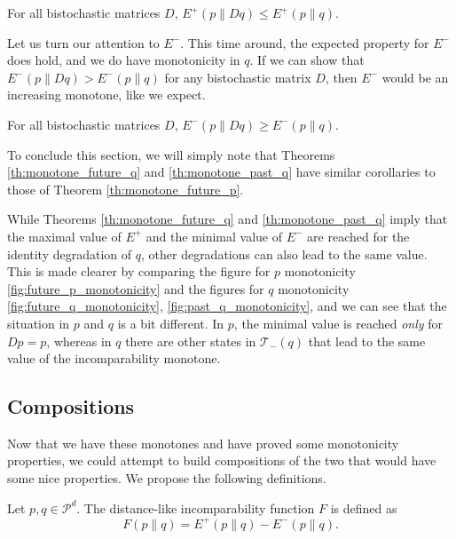 \begin{theorem} \label{th:monotone_future_q}
    For all bistochastic matrices $D$, $E^+ (p \parallel Dq) \leq E^+ (p \parallel q)$.
\end{theorem}

Let us turn our attention to $E^-$. This time around, the expected property for $E^-$ does hold, and we do have monotonicity in $q$. If we can show that $E^-(p \parallel Dq) > E^-(p \parallel q)$ for any bistochastic matrix $D$, then $E^-$ would be an increasing monotone, like we expect.

\begin{theorem} \label{th:monotone_past_q}
    For all bistochastic matrices $D$, $E^- (p \parallel Dq) \geq E^- (p \parallel q)$.
\end{theorem}

To conclude this section, we will simply note that Theorems \ref{th:monotone_future_q} and \ref{th:monotone_past_q} have similar corollaries to those of Theorem \ref{th:monotone_future_p}.

\begin{remark}
    While Theorems \ref{th:monotone_future_q} and \ref{th:monotone_past_q} imply that the maximal value of $E^+$ and the minimal value of $E^-$ are reached for the identity degradation of $q$, other degradations can also lead to the same value. This is made clearer by comparing the figure for $p$ monotonicity \ref{fig:future_p_monotonicity} and the figures for $q$ monotonicity \ref{fig:future_q_monotonicity}, \ref{fig:past_q_monotonicity}, and we can see that the situation in $p$ and $q$ is a bit different. In $p$, the minimal value is reached \textit{only} for $Dp = p$, whereas in $q$ there are other states in $\mathcal{T}_-(q)$ that lead to the same value of the incomparability monotone. 
\end{remark}



\subsection{Compositions}

Now that we have these monotones and have proved some monotonicity properties, we could attempt to build compositions of the two that would have some nice properties. We propose the following definitions.

\begin{definition} \label{def:distance-like_function}
    Let $p, q \in \mathcal{P}^d$. The distance-like incomparability function $F$ is defined as 
    \begin{equation}
        F(p \parallel q) = E^+(p \parallel q) - E^-(p \parallel q).
    \end{equation}
\end{definition}

